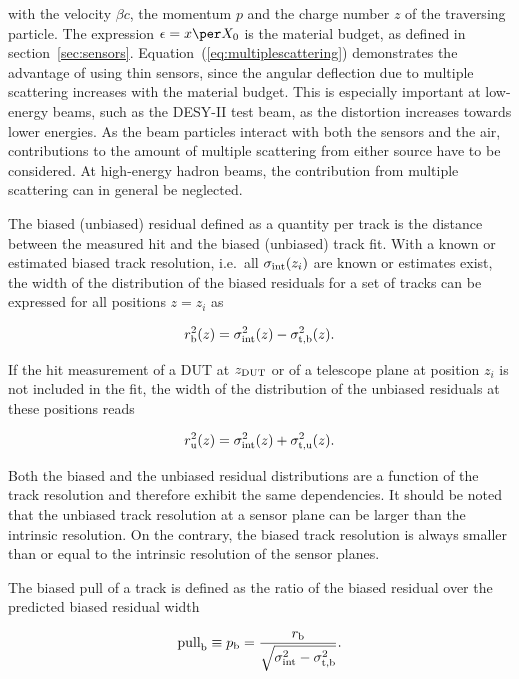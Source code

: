 \noindent with the velocity $\beta c$, the momentum $p$ and the charge number $z$ of the traversing particle. 
The expression $\epsilon = x \per X_0$ is the material budget, as defined in section~\ref{sec:sensors}.
%
Equation~(\ref{eq:multiplescattering}) demonstrates the advantage of using thin sensors, since the angular deflection due to multiple scattering increases with the material budget.
This is especially important at low-energy beams, such as the DESY-II test beam, as the distortion increases towards lower energies.
As the beam particles interact with both the sensors and the air, contributions to the amount of multiple scattering from either source have to be considered.
At high-energy hadron beams, the contribution from multiple scattering can in general be neglected. 
 
The biased (unbiased) residual defined as a quantity per track is the distance between the measured hit and the biased (unbiased) track fit. 
With a known or estimated biased track resolution, i.e.\ all $\sigma_{\textrm{int}}(z_i)$ are known or estimates exist,
 the width of the distribution of the biased residuals for a set of tracks can be expressed for all positions $z = z_i$ as

\begin{equation}
 \label{eq:telescoperesolutionequation1}
 r_{\textrm{b}}^2(z) = \sigma_{\textrm{int}}^2(z) - \sigma_{\textrm{t,b}}^2(z).
\end{equation}

\noindent
If the hit measurement of a DUT at $z_{\textrm{DUT}}$ or of a telescope plane at position $z_i$ is not included in the fit,
 the width of the distribution of the unbiased residuals at these positions reads~\cite{ref:eudetreport200902}
 
\begin{equation}
r_{\textrm{u}}^2(z) = \sigma_{\textrm{int}}^2(z) + \sigma_{\textrm{t,u}}^2(z).
\label{eq:telescoperesolutionequation2} 
\end{equation}

\noindent
Both the biased and the unbiased residual distributions are a function of the track resolution and therefore exhibit the same dependencies.
It should be noted that the unbiased track resolution at a sensor plane can be larger than the intrinsic resolution. 
On the contrary, the biased track resolution is always smaller than or equal to the intrinsic resolution of the sensor planes. 

The biased pull of a track is defined as the ratio of the biased residual over the predicted biased residual width

\begin{equation}
 \textrm{pull}_{\textrm{b}} \equiv p_{\textrm{b}} = \frac{r_{\textrm{b}}}{\sqrt{\sigma_{\textrm{int}}^2 - \sigma_{\textrm{t,b}}^2}}.
 \label{eq:pull}
\end{equation}

